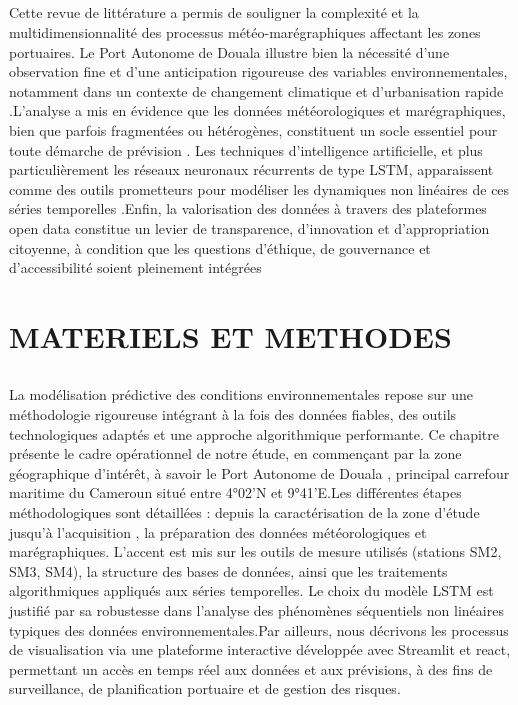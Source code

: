 \documentclass[a4paper,12pt,openany]{report}
\begin{document}
\section*{}
\quad Cette revue de littérature a permis de souligner la complexité et la multidimensionnalité des processus météo-marégraphiques affectant les zones portuaires. Le Port Autonome de Douala illustre bien la nécessité d’une observation fine et d’une anticipation rigoureuse des variables environnementales, notamment dans un contexte de changement climatique et d’urbanisation rapide\cite{Boko2007} .L’analyse a mis en évidence que les données météorologiques et marégraphiques, bien que parfois fragmentées ou hétérogènes, constituent un socle essentiel pour toute démarche de prévision\cite{OMM2021} . Les techniques d’intelligence artificielle, et plus particulièrement les réseaux neuronaux récurrents de type LSTM, apparaissent comme des outils prometteurs pour modéliser les dynamiques non linéaires de ces séries temporelles\cite{Greff2017} .Enfin, la valorisation des données à travers des plateformes open data constitue un levier de transparence, d’innovation et d’appropriation citoyenne, à condition que les questions d’éthique, de gouvernance et d’accessibilité soient pleinement intégrées\cite{Janssen2012} 
 


\chapter{MATERIELS ET METHODES}
\label{chap:Methode}	


	\section*{}
\quad La modélisation prédictive des conditions environnementales repose sur une méthodologie rigoureuse intégrant à la fois des données fiables, des outils technologiques adaptés et une approche algorithmique performante. Ce chapitre présente le cadre opérationnel de notre étude, en commençant par la zone géographique d’intérêt, à savoir le Port Autonome de Douala , principal carrefour maritime du Cameroun situé entre 4°02’N et 9°41’E.Les différentes étapes méthodologiques sont détaillées : depuis la caractérisation de la zone d’étude jusqu’à l’acquisition , la préparation des données météorologiques et marégraphiques. L’accent est mis sur les outils de mesure utilisés (stations SM2, SM3, SM4), la structure des bases de données, ainsi que les traitements algorithmiques appliqués aux séries temporelles. Le choix du modèle LSTM est justifié par sa robustesse dans l’analyse des phénomènes séquentiels non linéaires typiques des données environnementales.Par ailleurs, nous décrivons les processus de visualisation via une plateforme interactive développée avec Streamlit et react, permettant un accès en temps réel aux données et aux prévisions, à des fins de surveillance, de planification portuaire et de gestion des risques.
	\newpage
\end{document}
